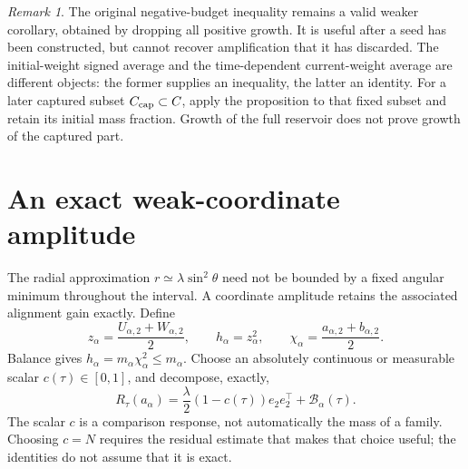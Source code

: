 \documentclass[11pt]{article}
\numberwithin{equation}{section}
\theoremstyle{remark}\newtheorem{remark}[theorem]{Remark}
\newcommand{\1}{\mathbf1}
\begin{document}
\begin{remark}
The original negative-budget inequality remains a valid weaker corollary,
obtained by dropping all positive growth. It is useful after a seed has been
constructed, but cannot recover amplification that it has discarded. The
initial-weight signed average and the time-dependent current-weight average
are different objects: the former supplies an inequality, the latter an
identity. For a later captured subset $C_{\rm cap}\subset C$, apply the
proposition to that fixed subset and retain its initial mass fraction.
Growth of the full reservoir does not prove growth of the captured part.
\end{remark}

\section{An exact weak-coordinate amplitude}
The radial approximation $r\simeq\lambda\sin^2\theta$ need not be bounded
by a fixed angular minimum throughout the interval. A coordinate amplitude
retains the associated alignment gain exactly.
Define
\begin{equation}\label{inc:SGWR:v1:amplitude}
 z_\alpha=\frac{U_{\alpha,2}+W_{\alpha,2}}2,
 \qquad h_\alpha=z_\alpha^2,
 \qquad \chi_\alpha=\frac{a_{\alpha,2}+b_{\alpha,2}}2.
\end{equation}
Balance gives $h_\alpha=m_\alpha\chi_\alpha^2\le m_\alpha$.
Choose an absolutely continuous or measurable scalar $c(\tau)\in[0,1]$,
and decompose, exactly,
\begin{equation}\label{inc:SGWR:v1:defect}
 R_\tau(a_\alpha)
 =\frac\lambda2(1-c(\tau))e_2e_2^\top+\mathcal B_\alpha(\tau).
\end{equation}
The scalar $c$ is a comparison response, not automatically the mass of a
family. Choosing $c=N$ requires the residual estimate that makes that choice
useful; the identities do not assume that it is exact.
\end{document}
